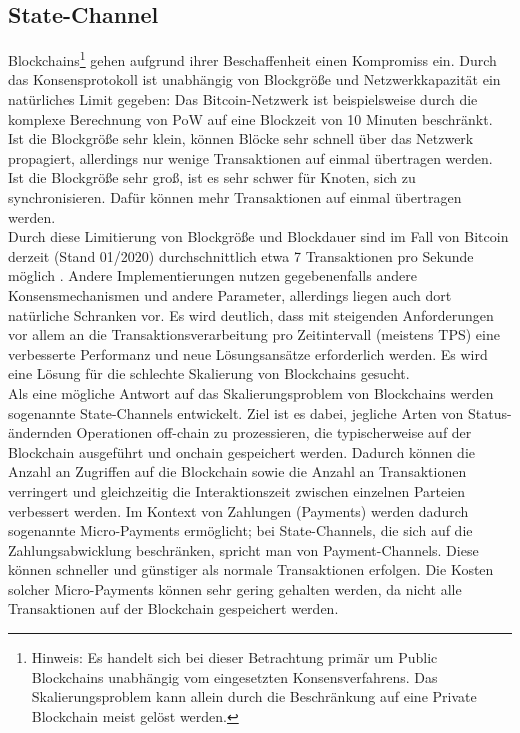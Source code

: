 \subsection{State-Channel}
\label{subsec:fundamentals:dlt:scaling}
Blockchains\footnote{Hinweis: Es handelt sich bei dieser Betrachtung primär um Public Blockchains unabhängig vom eingesetzten Konsensverfahrens. Das Skalierungsproblem kann allein durch die Beschränkung auf eine Private Blockchain meist gelöst werden.} gehen aufgrund ihrer Beschaffenheit einen Kompromiss ein. Durch das Konsensprotokoll ist unabhängig von Blockgröße und Netzwerkkapazität ein natürliches Limit gegeben: Das Bitcoin-Netzwerk ist beispielsweise durch die komplexe Berechnung von \ac{PoW} auf eine Blockzeit von 10 Minuten beschränkt. Ist die Blockgröße sehr klein, können Blöcke sehr schnell über das Netzwerk propagiert, allerdings nur wenige Transaktionen auf einmal übertragen werden. Ist die Blockgröße sehr groß, ist es sehr schwer für Knoten, sich zu synchronisieren. Dafür können mehr Transaktionen auf einmal übertragen werden.\\
Durch diese Limitierung von Blockgröße und Blockdauer sind im Fall von Bitcoin derzeit (Stand 01/2020) durchschnittlich etwa 7 Transaktionen pro Sekunde möglich \cite{Macdonald2017}. Andere Implementierungen nutzen gegebenenfalls andere Konsensmechanismen und andere Parameter, allerdings liegen auch dort natürliche Schranken vor. Es wird deutlich, dass mit steigenden Anforderungen vor allem an die Transaktionsverarbeitung pro Zeitintervall (meistens \ac{TPS}) eine verbesserte Performanz und neue Lösungsansätze erforderlich werden. Es wird eine Lösung für die schlechte Skalierung von Blockchains gesucht. \cite{Macdonald2017}\\
Als eine mögliche Antwort auf das Skalierungsproblem von Blockchains werden sogenannte State-Channels entwickelt. Ziel ist es dabei, jegliche Arten von Status-ändernden Operationen off-chain zu prozessieren, die typischerweise auf der Blockchain ausgeführt und onchain gespeichert werden. Dadurch können die Anzahl an Zugriffen auf die Blockchain sowie die Anzahl an Transaktionen verringert und gleichzeitig die Interaktionszeit zwischen einzelnen Parteien verbessert werden. Im Kontext von Zahlungen (Payments) werden dadurch sogenannte Micro-Payments ermöglicht; bei State-Channels, die sich auf die Zahlungsabwicklung beschränken, spricht man von Payment-Channels. Diese können schneller und günstiger als normale Transaktionen erfolgen. Die Kosten solcher Micro-Payments können sehr gering gehalten werden, da nicht alle Transaktionen auf der Blockchain gespeichert werden. \cite{Coleman2018}\\
